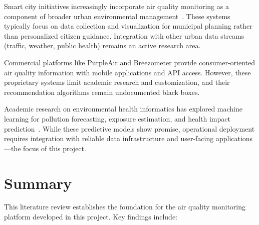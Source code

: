 Smart city initiatives increasingly incorporate air quality monitoring as a component of broader urban environmental management~\citep{mdpi}. These systems typically focus on data collection and visualization for municipal planning rather than personalized citizen guidance. Integration with other urban data streams (traffic, weather, public health) remains an active research area.

Commercial platforms like PurpleAir and Breezometer provide consumer-oriented air quality information with mobile applications and API access. However, these proprietary systems limit academic research and customization, and their recommendation algorithms remain undocumented black boxes.

Academic research on environmental health informatics has explored machine learning for pollution forecasting, exposure estimation, and health impact prediction~\citep{esr}. While these predictive models show promise, operational deployment requires integration with reliable data infrastructure and user-facing applications—the focus of this project.

\section{Summary}
\label{sec:lit_summary}

This literature review establishes the foundation for the air quality monitoring platform developed in this project. Key findings include:

